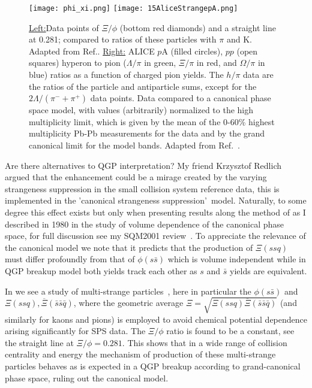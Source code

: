 \documentclass{appolb}
\begin{document}
\begin{figure}[bht]
\centerline{%
\texttt{[image: phi\_xi.png]}
\texttt{[image: 15AliceStrangepA.png]}
}
\caption{\underline{Left:}Data points of $\Xi/\phi$ (bottom red diamonds) and a straight line at 0.281; compared to ratios of these particles with $\pi$ and K. Adapted from Ref.\;\cite{Petran:2009dc}. \underline{Right:} ALICE $p$A (filled circles), $pp$ (open squares) hyperon to pion ($\Lambda/\pi$ in green, $\Xi/\pi$ in red, and $\Omega/\pi$ in blue) ratios as a function of charged pion yields. The $h/\pi$ data are the ratios of the particle and antiparticle sums, except for the $2\Lambda/(\pi^-+\pi^+)$ data points. Data compared to a canonical phase space model, with values (arbitrarily) normalized to the high multiplicity limit, which is given by the mean of the 0-60\% highest multiplicity Pb-Pb measurements for the data and by the grand canonical limit for the model bands. Adapted from Ref.\;~\cite{Adam:2015vsf}.}
\label{CanonicalEndFig}
\end{figure}

Are there alternatives to QGP interpretation? My friend Krzysztof Redlich argued that the enhancement could be a mirage created by the varying strangeness suppression in the small collision system reference data, this is implemented in the \rq canonical strangeness suppression\rq\ model. Naturally, to some degree this effect exists but only when presenting results along the method of  as I described in 1980 in the study of volume dependence of the canonical phase space, for full discussion see my SQM2001 review~\cite{Rafelski:2001bu}. To appreciate the relevance of the canonical model we note that it predicts that the production of $\Xi(ssq)$ must differ profoundly from that of $\phi(s\bar s)$ which is volume independent while in QGP breakup model both yields track each other as $s$ and $\bar s$ yields are equivalent. 

In   we see a study of multi-strange particles~\cite{Petran:2009dc}, here in particular the $\phi(s\bar s)$ and $\Xi(ssq),\overline{\Xi}(\bar s\bar s\bar q)$, where the geometric average $\Xi=\sqrt{\Xi(ssq)\overline{\Xi}(\bar s\bar s\bar q)}$ (and similarly for kaons and pions) is employed to avoid chemical potential dependence arising significantly for SPS data. The $\Xi/\phi$ ratio is found to be a constant, see the straight line at $\Xi/\phi=0.281$. This shows that in a wide range of collision centrality and energy the mechanism of production of these multi-strange particles behaves as is expected in a QGP breakup according to grand-canonical phase space, ruling out the canonical model. 
\end{document}
